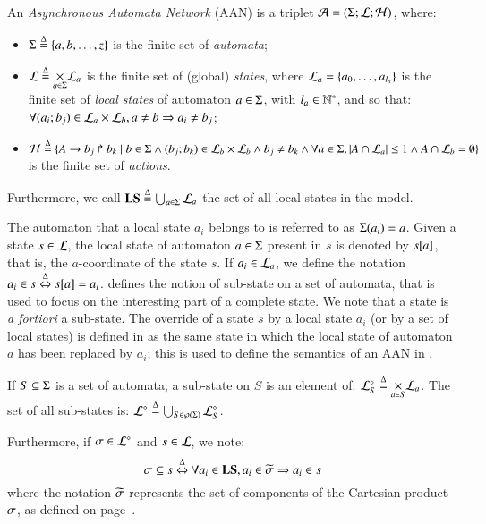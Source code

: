 \begin{definition}
\label{def:ph}
  An \emph{Asynchronous Automata Network} (AAN) is a triplet $\PH = (\PHs; \PHl; \PHa)$,
  where:
  \begin{itemize}
    \item $\PHs \DEF \{a, b, \dots, z\}$ is the finite set of \emph{automata};
    \item $\PHl \DEF \underset{a \in \PHs}{\times} \PHl_a$ is the finite set of
      (global) \emph{states},
      where $\PHl_a = \{a_0, \ldots, a_{l_a}\}$ is the finite set of \emph{local states}
      of automaton $a \in \PHs$, with $l_a \in \sN^*$,
      and so that:
      $\forall (a_i; b_j) \in \PHl_a \times \PHl_b, a \neq b \Rightarrow a_i \neq b_j$;
    \item $\PHa \DEF \{\PHfrappe{A}{b_j}{b_k} \mid
      b \in \PHs \wedge (b_j; b_k) \in \PHl_b \times \PHl_b \wedge
      b_j \neq b_k \wedge
      \forall a \in \PHs, \card{A \cap \PHl_a} \leq 1 \wedge
      A \cap \PHl_b = \emptyset \}$ is the finite set of \emph{actions}.
  \end{itemize}
  Furthermore,
  we call $\PHproc \DEF \bigcup_{a \in \PHs} \PHl_a$ the set of all local states in the model.
\end{definition}
%
\noindent
The automaton that a local state $a_i$ belongs to is referred to as $\PHsort(a_i) = a$.
Given a state $s\in \PHl$, the local state of automaton $a \in \PHs$ present in $s$ is denoted by $\PHget{s}{a}$, that is, the $a$-coordinate of the state $s$.
If $a_i \in \PHl_a$, we define the notation $a_i \in s \EQDEF \PHget{s}{a} = a_i$.
 defines the notion of sub-state on a set of automata, that is used to focus on the interesting part of a complete state.
We note that a state is \textit{a fortiori} a sub-state.
The override of a state $s$ by a local state $a_i$ (or by a set of local states)
is defined in  as the same state in which the local state of automaton $a$ has been replaced by $a_i$;
this is used to define the semantics of an AAN in .
%
\begin{definition}
\label{def:substate}
  If $S \subseteq \PHs$ is a set of automata, a sub-state on $S$ is an element of:
  $\PHsubl[\PHl]_S \DEF \bigtimes{a \in S} \PHl_a$.
  The set of all sub-states is:
  $\PHsubl[\PHl] \DEF \bigcup_{S \in\powerset(\PHs)} \PHsubl[\PHl]_S$.
  
  \noindent
  Furthermore, if $\mysigma \in \PHsubl[\PHl]$ and $s \in \PHl$, we note:
    \[\mysigma \subseteq s \EQDEF \forall a_i \in \Proc, a_i \in \toset{\mysigma} \Rightarrow a_i \in s\]
  where the notation $\toset{\mysigma}$ represents
  the set of components of the Cartesian product $\mysigma$,
  as defined on page~\pageref{notations}.
\end{definition}

